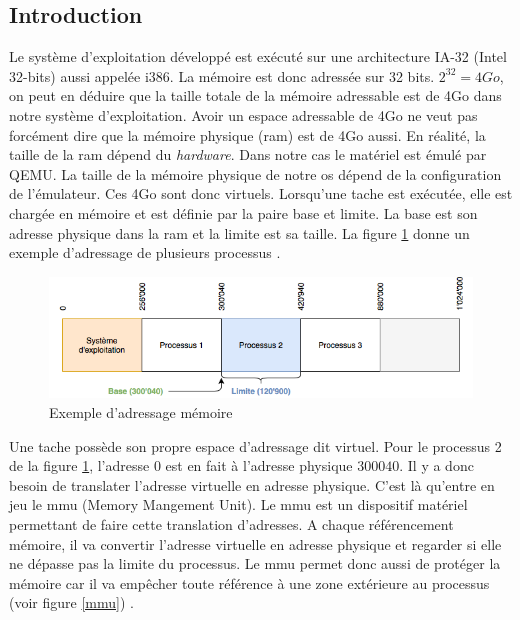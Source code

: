 
\subsection{Introduction}
Le système d'exploitation développé est exécuté sur une architecture \acrshort{IA-32}
(Intel 32-bits) aussi appelée i386. La mémoire est donc adressée sur 32 bits.
$2^{32}=4Go$, on peut en déduire que la taille totale de la mémoire adressable est
de 4Go dans notre système d'exploitation. Avoir un espace adressable de 4Go ne veut
pas forcément dire que la mémoire physique (\acrshort{ram}) est de 4Go aussi. En
réalité, la taille de la \acrshort{ram} dépend du \textit{hardware}. Dans notre
cas le matériel est émulé par QEMU. La taille de la mémoire physique de notre \acrshort{os}
dépend de la configuration de l'émulateur. Ces 4Go sont donc virtuels. Lorsqu'une
tache est exécutée, elle est chargée en mémoire et est définie par la paire base
et limite. La base est son adresse physique dans la \acrshort{ram} et la limite
est sa taille. La figure \ref{ex_base_limit} donne un exemple d'adressage de plusieurs
processus \cite{ref42}.

\begin{figure}[!h]
  \centering
  \includegraphics[scale=0.6]{images/ex_base_limit.png}
  \caption{Exemple d'adressage mémoire}
  \label{ex_base_limit}
\end{figure}

Une tache possède son propre espace d'adressage dit virtuel. Pour le processus 2
de la figure \ref{ex_base_limit}, l'adresse $0$ est en fait à l'adresse physique
$300040$. Il y a donc besoin de translater l'adresse virtuelle en adresse physique.
C'est là qu'entre en jeu le \acrshort{mmu} (Memory Mangement Unit). Le \acrshort{mmu}
est un dispositif matériel permettant de faire cette translation d'adresses. A chaque
référencement mémoire, il va convertir l'adresse virtuelle en adresse physique et
regarder si elle ne dépasse pas la limite du processus. Le \acrshort{mmu} permet donc
aussi de protéger la mémoire car il va empêcher toute référence à une zone extérieure
au processus (voir figure \ref{mmu}) \cite{ref42}.

